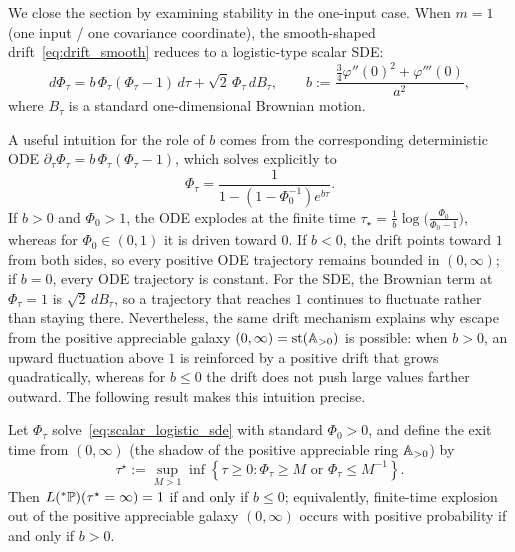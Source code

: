 We close the section by examining stability in the one-input case. When $m = 1$ (one input / one covariance coordinate), the smooth-shaped drift~\eqref{eq:drift_smooth} reduces to a logistic-type scalar SDE:
\begin{equation}\label{eq:scalar_logistic_sde}
d\Phi_\tau = b\,\Phi_\tau(\Phi_\tau - 1)\,d\tau + \sqrt{2}\,\Phi_\tau\,dB_\tau, \qquad b := \frac{\frac{3}{4}\varphi''(0)^2 + \varphi'''(0)}{a^2},
\end{equation}
where $B_\tau$ is a standard one-dimensional Brownian motion.

A useful intuition for the role of $b$ comes from the corresponding deterministic ODE $\partial_\tau \Phi_\tau = b\,\Phi_\tau(\Phi_\tau - 1)$, which solves explicitly to
\begin{equation}\label{eq:scalar_logistic_ode}
\Phi_\tau = \frac{1}{1 - (1 - \Phi_0^{-1})e^{b\tau}}.
\end{equation}
If $b > 0$ and $\Phi_0 > 1$, the ODE explodes at the finite time $\tau_\star = \frac{1}{b}\log\!\bigl(\frac{\Phi_0}{\Phi_0 - 1}\bigr)$, whereas for $\Phi_0 \in (0, 1)$ it is driven toward $0$. If $b < 0$, the drift points toward $1$ from both sides, so every positive ODE trajectory remains bounded in $(0, \infty)$; if $b = 0$, every ODE trajectory is constant. For the SDE, the Brownian term at $\Phi_\tau = 1$ is $\sqrt{2}\,dB_\tau$, so a trajectory that reaches $1$ continues to fluctuate rather than staying there. Nevertheless, the same drift mechanism explains why escape from the positive appreciable galaxy $(0, \infty) = \operatorname{st}(\mathbb{A}_{>0})$ is possible: when $b > 0$, an upward fluctuation above $1$ is reinforced by a positive drift that grows quadratically, whereas for $b \le 0$ the drift does not push large values farther outward. The following result makes this intuition precise.

\begin{proposition}\label{prop:scalar_explosion}
Let $\Phi_\tau$ solve~\eqref{eq:scalar_logistic_sde} with standard $\Phi_0 > 0$, and define the exit time from $(0, \infty)$ (the shadow of the positive appreciable ring $\mathbb{A}_{>0}$) by
\begin{equation}\label{eq:explosion_time_def}
\tau^\star := \sup_{M > 1} \inf\left\{\tau \ge 0 : \Phi_\tau \ge M \text{ or } \Phi_\tau \le M^{-1}\right\}.
\end{equation}
Then $L({}^*\mathbb{P})(\tau^\star = \infty) = 1$ if and only if $b \le 0$; equivalently, finite-time explosion out of the positive appreciable galaxy $(0, \infty)$ occurs with positive probability if and only if $b > 0$.
\end{proposition}

